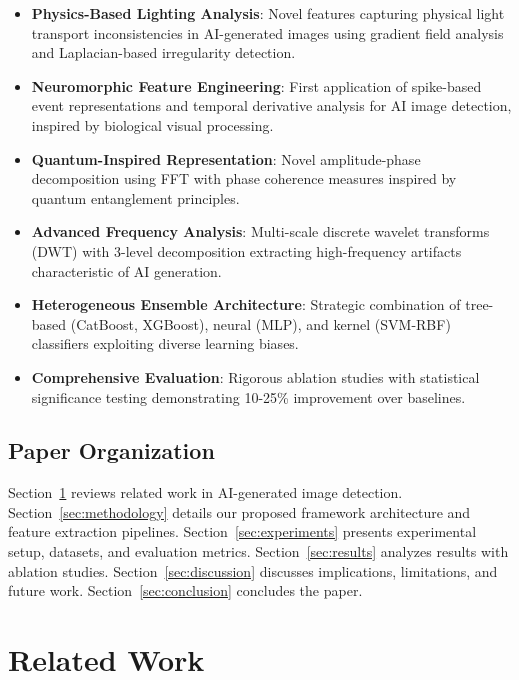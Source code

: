 \documentclass[runningheads]{llncs}
\begin{document}
\begin{itemize}
    \item \textbf{Physics-Based Lighting Analysis}: Novel features capturing physical light transport inconsistencies in AI-generated images using gradient field analysis and Laplacian-based irregularity detection.
    
    \item \textbf{Neuromorphic Feature Engineering}: First application of spike-based event representations and temporal derivative analysis for AI image detection, inspired by biological visual processing.
    
    \item \textbf{Quantum-Inspired Representation}: Novel amplitude-phase decomposition using FFT with phase coherence measures inspired by quantum entanglement principles.
    
    \item \textbf{Advanced Frequency Analysis}: Multi-scale discrete wavelet transforms (DWT) with 3-level decomposition extracting high-frequency artifacts characteristic of AI generation.
    
    \item \textbf{Heterogeneous Ensemble Architecture}: Strategic combination of tree-based (CatBoost, XGBoost), neural (MLP), and kernel (SVM-RBF) classifiers exploiting diverse learning biases.
    
    \item \textbf{Comprehensive Evaluation}: Rigorous ablation studies with statistical significance testing demonstrating 10-25\% improvement over baselines.
\end{itemize}

\subsection{Paper Organization}

Section~\ref{sec:related} reviews related work in AI-generated image detection. Section~\ref{sec:methodology} details our proposed framework architecture and feature extraction pipelines. Section~\ref{sec:experiments} presents experimental setup, datasets, and evaluation metrics. Section~\ref{sec:results} analyzes results with ablation studies. Section~\ref{sec:discussion} discusses implications, limitations, and future work. Section~\ref{sec:conclusion} concludes the paper.

\section{Related Work}
\label{sec:related}
\end{document}

